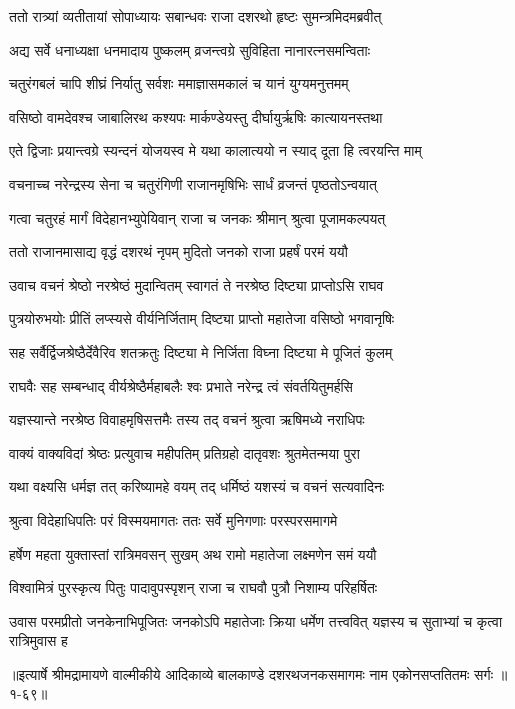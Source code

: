 
\twolineshloka
{ततो रात्र्यां व्यतीतायां सोपाध्यायः सबान्धवः}
{राजा दशरथो हृष्टः सुमन्त्रमिदमब्रवीत्} %

\twolineshloka
{अद्य सर्वे धनाध्यक्षा धनमादाय पुष्कलम्}
{व्रजन्त्वग्रे सुविहिता नानारत्नसमन्विताः} %

\twolineshloka
{चतुरंगबलं चापि शीघ्रं निर्यातु सर्वशः}
{ममाज्ञासमकालं च यानं युग्यमनुत्तमम्} %

\twolineshloka
{वसिष्ठो वामदेवश्च जाबालिरथ कश्यपः}
{मार्कण्डेयस्तु दीर्घायुर्ऋषिः कात्यायनस्तथा} %

\twolineshloka
{एते द्विजाः प्रयान्त्वग्रे स्यन्दनं योजयस्व मे}
{यथा कालात्ययो न स्याद् दूता हि त्वरयन्ति माम्} %

\twolineshloka
{वचनाच्च नरेन्द्रस्य सेना च चतुरंगिणी}
{राजानमृषिभिः सार्धं व्रजन्तं पृष्ठतोऽन्वयात्} %

\twolineshloka
{गत्वा चतुरहं मार्गं विदेहानभ्युपेयिवान्}
{राजा च जनकः श्रीमान् श्रुत्वा पूजामकल्पयत्} %

\twolineshloka
{ततो राजानमासाद्य वृद्धं दशरथं नृपम्}
{मुदितो जनको राजा प्रहर्षं परमं ययौ} %

\twolineshloka
{उवाच वचनं श्रेष्ठो नरश्रेष्ठं मुदान्वितम्}
{स्वागतं ते नरश्रेष्ठ दिष्ट्या प्राप्तोऽसि राघव} %

\twolineshloka
{पुत्रयोरुभयोः प्रीतिं लप्स्यसे वीर्यनिर्जिताम्}
{दिष्ट्या प्राप्तो महातेजा वसिष्ठो भगवानृषिः} %

\twolineshloka
{सह सर्वैर्द्विजश्रेष्ठैर्देवैरिव शतक्रतुः}
{दिष्ट्या मे निर्जिता विघ्ना दिष्ट्या मे पूजितं कुलम्} %

\twolineshloka
{राघवैः सह सम्बन्धाद् वीर्यश्रेष्ठैर्महाबलैः}
{श्वः प्रभाते नरेन्द्र त्वं संवर्तयितुमर्हसि} %

\twolineshloka
{यज्ञस्यान्ते नरश्रेष्ठ विवाहमृषिसत्तमैः}
{तस्य तद् वचनं श्रुत्वा ऋषिमध्ये नराधिपः} %

\twolineshloka
{वाक्यं वाक्यविदां श्रेष्ठः प्रत्युवाच महीपतिम्}
{प्रतिग्रहो दातृवशः श्रुतमेतन्मया पुरा} %

\twolineshloka
{यथा वक्ष्यसि धर्मज्ञ तत् करिष्यामहे वयम्}
{तद् धर्मिष्ठं यशस्यं च वचनं सत्यवादिनः} %

\twolineshloka
{श्रुत्वा विदेहाधिपतिः परं विस्मयमागतः}
{ततः सर्वे मुनिगणाः परस्परसमागमे} %

\twolineshloka
{हर्षेण महता युक्तास्तां रात्रिमवसन् सुखम्}
{अथ रामो महातेजा लक्ष्मणेन समं ययौ} %

\twolineshloka
{विश्वामित्रं पुरस्कृत्य पितुः पादावुपस्पृशन्}
{राजा च राघवौ पुत्रौ निशाम्य परिहर्षितः} %

\threelineshloka
{उवास परमप्रीतो जनकेनाभिपूजितः}
{जनकोऽपि महातेजाः क्रिया धर्मेण तत्त्ववित्}
{यज्ञस्य च सुताभ्यां च कृत्वा रात्रिमुवास ह} %


॥इत्यार्षे श्रीमद्रामायणे वाल्मीकीये आदिकाव्ये बालकाण्डे दशरथजनकसमागमः नाम एकोनसप्ततितमः सर्गः ॥१-६९॥
